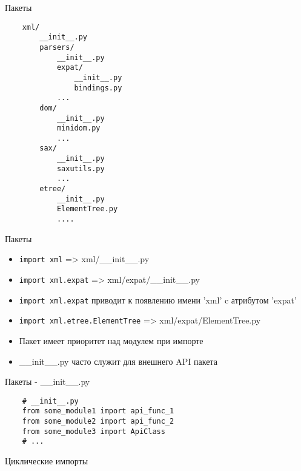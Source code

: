 \documentclass{article}
\begin{document}
\begin{center} Пакеты \end{center}
\Large
\begin{verbatim}
    xml/
        __init__.py
        parsers/
            __init__.py
            expat/
                __init__.py
                bindings.py
            ...
        dom/
            __init__.py
            minidom.py
            ...
        sax/
            __init__.py
            saxutils.py
            ...
        etree/
            __init__.py
            ElementTree.py
            ....
\end{verbatim}
\newpage
\LARGE

\begin{center} Пакеты \end{center}
\begin{itemize}
    \item \lstinline!import xml! => xml/\_\_init\_\_.py
    \item \lstinline!import xml.expat! => xml/expat/\_\_init\_\_.py
    \item \lstinline!import xml.expat! приводит к появлению имени 'xml' c атрибутом 'expat'
    \item \lstinline!import xml.etree.ElementTree! => xml/expat/ElementTree.py
    \item Пакет имеет приоритет над модулем при импорте
    \item \_\_init\_\_.py часто служит для внешнего API пакета
\end{itemize}
\newpage

\begin{center} Пакеты - \_\_init\_\_.py \end{center}
\begin{lstlisting}
    # __init__.py
    from some_module1 import api_func_1
    from some_module2 import api_func_2
    from some_module3 import ApiClass
    # ...
\end{lstlisting}
\newpage

\begin{center} Циклические импорты \end{center}
\end{document}
